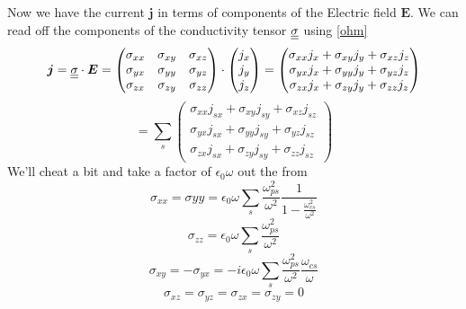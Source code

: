 Now we have the current $\bm{j}$ in terms of components of the Electric field $\bm{E}$. We can read off the components of the conductivity tensor $\underline{\underline{\sigma}}$ using \eqref{ohm}
\begin{equation}
	\bm{j} = \underline{\underline{\sigma}} \cdot \bm{E} = 
	\begin{pmatrix}
		\sigma_{xx} & \sigma_{xy} & \sigma_{xz} \\
		\sigma_{yx} & \sigma_{yy} & \sigma_{yz} \\
		\sigma_{zx} & \sigma_{zy} & \sigma_{zz}
	\end{pmatrix} \cdot 
	\begin{pmatrix}
		j_x \\ j_y \\ j_z
	\end{pmatrix} = 
	\begin{pmatrix}
		\sigma_{xx} j_x + \sigma_{xy} j_y + \sigma_{xz} j_z \\
		\sigma_{yx} j_x + \sigma_{yy} j_y + \sigma_{yz} j_z \\
		\sigma_{zx} j_x + \sigma_{zy} j_y + \sigma_{zz} j_z
	\end{pmatrix}
\end{equation}
\begin{equation}
	= \sum_s
	\begin{pmatrix}
		\sigma_{xx} j_{sx} + \sigma_{xy} j_{sy} + \sigma_{xz} j_{sz} \\
		\sigma_{yx} j_{sx} + \sigma_{yy} j_{sy} + \sigma_{yz} j_{sz} \\
		\sigma_{zx} j_{sx} + \sigma_{zy} j_{sy} + \sigma_{zz} j_{sz}
	\end{pmatrix}
\end{equation}
We'll cheat a bit and take a factor of $\epsilon_0 \omega$ out the from
\begin{equation}
	\sigma_{xx} = \sigma{yy} = \epsilon_0 \omega \sum_s \frac{\omega_{ps}^2}{\omega^2} \frac{1}{1 - \frac{\omega_{cs}^2}{\omega^2}}
\end{equation}
\begin{equation}
	\sigma_{zz} = \epsilon_0 \omega \sum_s \frac{\omega_{ps}^2}{\omega^2}
\end{equation}
\begin{equation}
	\sigma_{xy} = -\sigma_{yx} = -i \epsilon_0 \omega \sum_s \frac{\omega_{ps}^2}{\omega^2} \frac{\omega_{cs}}{\omega}
\end{equation}
\begin{equation}
	\sigma_{xz} = \sigma_{yz} = \sigma_{zx} = \sigma_{zy} = 0
\end{equation}

